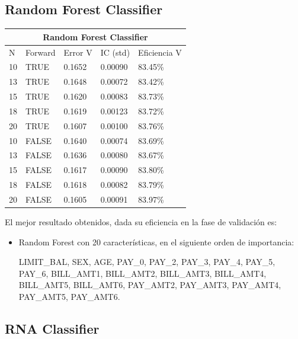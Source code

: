 \documentclass[conference]{IEEEtran}
\begin{document}
\subsection{Random Forest Classifier}\hfill
\begin{table}[h]
\centering
\begin{tabular}{lllll}
\hline
\multicolumn{5}{c}{\textbf{Random Forest Classifier}} \\ \hline
N & Forward & Error V & IC (std) & Eficiencia V \\ \hline
10 & TRUE & 0.1652 & 0.00090 & 83.45\% \\
13 & TRUE & 0.1648 & 0.00072 & 83.42\% \\
15 & TRUE & 0.1620 & 0.00083 & 83.73\% \\
18 & TRUE & 0.1619 & 0.00123 & 83.72\% \\
20 & TRUE & 0.1607 & 0.00100 & 83.76\% \\
10 & FALSE & 0.1640 & 0.00074 & 83.69\% \\
13 & FALSE & 0.1636 & 0.00080 & 83.67\% \\
15 & FALSE & 0.1617 & 0.00090 & 83.80\% \\
18 & FALSE & 0.1618 & 0.00082 & 83.79\% \\
20 & FALSE & 0.1605 & 0.00091 & 83.97\% \\ \hline
\end{tabular}
\end{table}\hfill



El mejor resultado obtenidos, dada su eficiencia en la fase de validación es:
\begin{itemize}
\item Random Forest con 20 características, en el siguiente orden de importancia:

LIMIT\_BAL, SEX, AGE, PAY\_0, PAY\_2, PAY\_3, PAY\_4, PAY\_5, PAY\_6, BILL\_AMT1, BILL\_AMT2, BILL\_AMT3, BILL\_AMT4, BILL\_AMT5, BILL\_AMT6, PAY\_AMT2, PAY\_AMT3, PAY\_AMT4, PAY\_AMT5, PAY\_AMT6.

\end{itemize}

\subsection{RNA Classifier}\hfill
\end{document}
